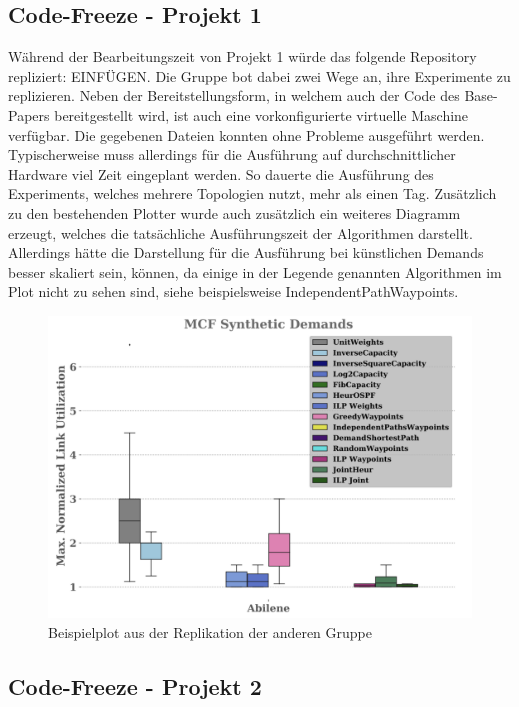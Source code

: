 \subsection{Code-Freeze - Projekt 1}
Während der Bearbeitungszeit von Projekt 1 würde das folgende Repository repliziert: EINFÜGEN.
Die Gruppe bot dabei zwei Wege an, ihre Experimente zu replizieren. Neben der Bereitstellungsform, in welchem auch der Code des Base-Papers bereitgestellt wird, ist auch eine vorkonfigurierte virtuelle Maschine verfügbar.
Die gegebenen Dateien konnten ohne Probleme ausgeführt werden. Typischerweise muss allerdings für die Ausführung auf durchschnittlicher Hardware viel Zeit eingeplant werden.
So dauerte die Ausführung des Experiments, welches mehrere Topologien nutzt, mehr als einen Tag. Zusätzlich zu den bestehenden Plotter wurde auch zusätzlich ein weiteres Diagramm erzeugt, 
welches die tatsächliche Ausführungszeit der Algorithmen darstellt. Allerdings hätte die Darstellung für die Ausführung bei künstlichen Demands besser skaliert sein, können, da einige in der Legende genannten Algorithmen im Plot nicht zu sehen sind, siehe beispielsweise IndependentPathWaypoints. 
\begin{figure}[h]
  \centering
  \includegraphics[width=\linewidth]{abbildungen/replik1}
  \caption{Beispielplot aus der Replikation der anderen Gruppe}
\end{figure}
\subsection{Code-Freeze - Projekt 2}








